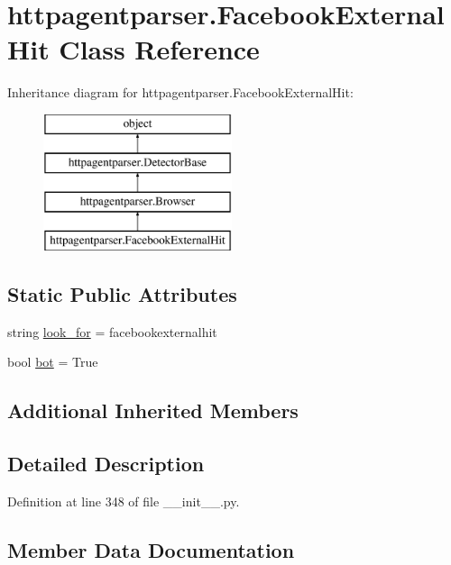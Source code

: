 \hypertarget{classhttpagentparser_1_1_facebook_external_hit}{}\section{httpagentparser.\+Facebook\+External\+Hit Class Reference}
\label{classhttpagentparser_1_1_facebook_external_hit}
Inheritance diagram for httpagentparser.\+Facebook\+External\+Hit\+:\begin{figure}[H]
\begin{center}
\leavevmode
\includegraphics[height=4.000000cm]{classhttpagentparser_1_1_facebook_external_hit}
\end{center}
\end{figure}
\subsection*{Static Public Attributes}
\begin{DoxyCompactItemize}
\item 
string \hyperlink{classhttpagentparser_1_1_facebook_external_hit_af5e02b266f88584a7e54f7984a987a6d}{look\+\_\+for} = \textquotesingle{}facebookexternalhit\textquotesingle{}
\item 
bool \hyperlink{classhttpagentparser_1_1_facebook_external_hit_a4482b8ac59f42d59c78844a9feb6eb28}{bot} = True
\end{DoxyCompactItemize}
\subsection*{Additional Inherited Members}


\subsection{Detailed Description}


Definition at line 348 of file \+\_\+\+\_\+init\+\_\+\+\_\+.\+py.



\subsection{Member Data Documentation}
\hypertarget{classhttpagentparser_1_1_facebook_external_hit_a4482b8ac59f42d59c78844a9feb6eb28}{}\label{classhttpagentparser_1_1_facebook_external_hit_a4482b8ac59f42d59c78844a9feb6eb28} 
